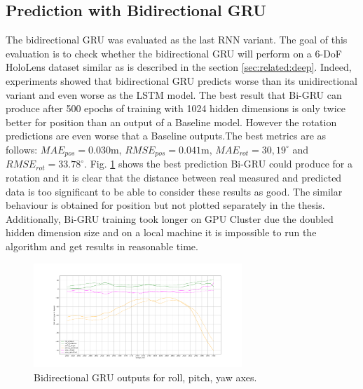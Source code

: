 \subsection{Prediction with Bidirectional GRU}
\label{sec:eval:experiments:bi-gru}
The bidirectional GRU was evaluated as the last RNN variant. The goal of this evaluation is to check whether the bidirectional GRU will perform on a 6-DoF HoloLens dataset similar as is described in the section \ref{sec:related:deep}. Indeed, experiments showed that bidirectional GRU predicts worse than its unidirectional variant and even worse as the LSTM model. The best result that Bi-GRU can produce after 500 epochs of training with 1024 hidden dimensions is only twice better for position than an output of a Baseline model. However the rotation predictions are even worse that a Baseline outputs.The best metrics are as follows: $MAE_{pos} = 0.030$m, $RMSE_{pos} = 0.041$m, $MAE_{rot} = 30,19^{\circ}$ and $RMSE_{rot}  =33.78^{\circ}$. Fig. \ref{fig:grubi} shows the best prediction Bi-GRU could produce for a rotation and it is clear that the distance between real measured and predicted data is too significant to be able to consider these results as good. The similar behaviour is obtained for position but not plotted separately in the thesis. Additionally, Bi-GRU training took longer on GPU Cluster due the doubled hidden dimension size and on a local machine it is impossible to run the algorithm and get results in reasonable time. 
\begin{figure}[h!]
	\begin{center}
		\includegraphics[width=0.7\textwidth, keepaspectratio]{gfx/gru-bi1-roll_pitch_yaw.pdf}
		\caption{Bidirectional GRU outputs for roll, pitch, yaw axes.}
		\label{fig:grubi}
	\end{center}
\end{figure}